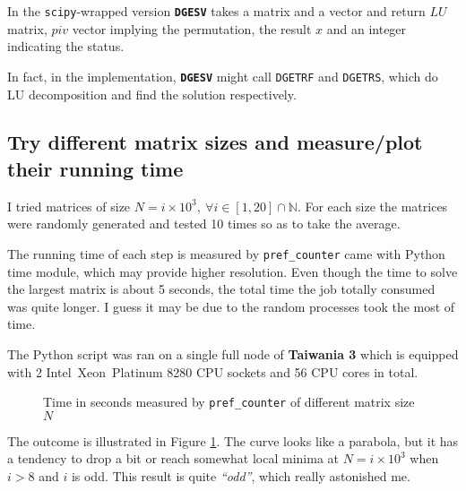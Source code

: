 \documentclass[12pt, a4paper]{article}
\begin{document}
In the \texttt{scipy}-wrapped version \texttt{\bfseries DGESV} takes a matrix and a vector and return $LU$ matrix, $piv$ vector implying the permutation, the result $x$ and an integer indicating the status.

In fact, in the implementation, \texttt{\bfseries DGESV} might call \texttt{DGETRF} and \texttt{DGETRS}, which do \textsf{LU decomposition} and find the solution respectively.

\subsection{Try different matrix sizes and measure/plot their running time}

I tried matrices of size $N=i\times10^3,\ \forall i\in[1, 20]\cap\mathbb{N}$. For each size the matrices were randomly generated and tested 10 times so as to take the average.

The running time of each step is measured by \texttt{pref\_counter} came with Python time module, which may provide higher resolution. Even though the time to solve the largest matrix is about 5 seconds, the total time the job totally consumed was quite longer. I guess it may be due to the random processes took the most of time.

The Python script was ran on a single full node of \textbf{Taiwania 3} which is equipped with 2 \textsf{Intel\textregistered\ Xeon\textregistered\ Platinum 8280} CPU sockets and 56 CPU cores in total.

\begin{figure}[htbp]


\caption{Time in seconds measured by \texttt{pref\_counter} of different matrix size $N$}
\label{fig:plot}

\end{figure}

The outcome is illustrated in Figure \ref{fig:plot}. The curve looks like a parabola, but it has a tendency to drop a bit or reach somewhat local minima at $N=i\times10^3$ when $i>8$ and $i$ is odd. This result is quite \textit{``odd''}, which really astonished me.
\end{document}
